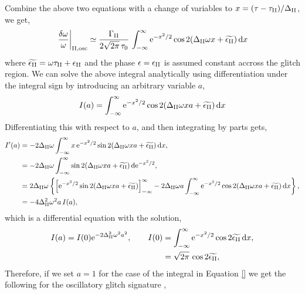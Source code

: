 Combine the above two equations with a change of variables to \(x = (\tau - \tau_{{\mathrm{II}}})/\Delta_{{\mathrm{II}}}\), we get,
%
\begin{equation}
    \left.\frac{\delta\omega}{\omega}\right|_{{\mathrm{II}}, \mathrm{osc}} \simeq \frac{\Gamma_{{\mathrm{II}}}}{2\sqrt{2\pi} \, \tau_0} \, \int_{-\infty}^\infty \mathrm{e}^{- x^2/2} \cos 2 (\Delta_{{\mathrm{II}}} \omega x + \widetilde{\epsilon_{{\mathrm{II}}}}) \, \mathrm{d} x
\end{equation}
%
where \(\widetilde{\epsilon_{{\mathrm{II}}}} = \omega\tau_{{\mathrm{II}}} + \epsilon_{{\mathrm{II}}}\) and the phase \(\epsilon=\epsilon_{{\mathrm{II}}}\) is assumed constant accross the glitch region. We can solve the above integral analytically using differentiation under the integral sign by introducing an arbitrary variable \(a\),
%
\begin{equation}
    I(a) = \int_{-\infty}^\infty \mathrm{e}^{- x^2/2 } \cos 2 (\Delta_{{\mathrm{II}}} \omega x a + \widetilde{\epsilon_{{\mathrm{II}}}}) \, \mathrm{d} x
\end{equation}
%
Differentiating this with respect to \(a\), and then integrating by parts gets,
%
\begin{align}
    I'(a) &= - 2 \Delta_{{\mathrm{II}}} \omega \int_{-\infty}^\infty x \, \mathrm{e}^{- x^2/2 } \sin 2 (\Delta_{{\mathrm{II}}} \omega x a + \widetilde{\epsilon_{{\mathrm{II}}}}) \, \mathrm{d} x, \notag\\
    &= - 2 \Delta_{{\mathrm{II}}} \omega \int_{-\infty}^\infty \sin 2 (\Delta_{{\mathrm{II}}} \omega x a + \widetilde{\epsilon_{{\mathrm{II}}}}) \, \mathrm{d} \mathrm{e}^{- x^2/2 }, \notag\\
    &= 2 \Delta_{{\mathrm{II}}} \omega \left\{ \left[ \mathrm{e}^{- x^2/2 } \sin 2 (\Delta_{{\mathrm{II}}} \omega x a + \widetilde{\epsilon_{{\mathrm{II}}}}) \right]_{-\infty}^\infty - 2 \Delta_{{\mathrm{II}}} \omega a \int_{-\infty}^\infty \mathrm{e}^{- x^2/2 } \cos 2 (\Delta_{{\mathrm{II}}} \omega x a + \widetilde{\epsilon_{{\mathrm{II}}}}) \, \mathrm{d} x \right\}, \notag\\
    &= - 4 \Delta_{{\mathrm{II}}}^2 \omega^2 a \, I(a),
\end{align}
%
which is a differential equation with the solution,
%
\begin{equation}
    \begin{split}
        I(a) = I(0) \mathrm{e}^{- 2 \Delta_{{\mathrm{II}}}^2 \omega^2 a^2}, \qquad I(0) &= \int_{-\infty}^\infty \mathrm{e}^{- x^2/2 } \cos 2 \widetilde{\epsilon_{{\mathrm{II}}}} \, \mathrm{d} x, \\
        &= \sqrt{2\pi} \, \cos 2 \widetilde{\epsilon_{{\mathrm{II}}}},
    \end{split}
\end{equation}
%
Therefore, if we set \(a = 1\) for the case of the integral in Equation \ref{} we get the following for the oscillatory glitch signature \citep[cf.][]{Houdek.Gough2007},
